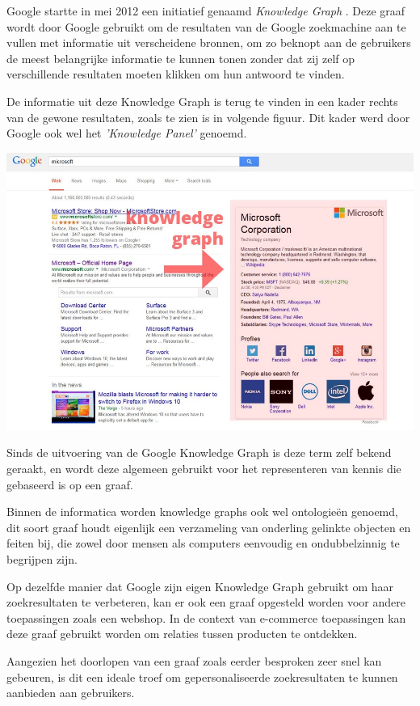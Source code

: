 Google startte in mei 2012 een initiatief genaamd \textit{Knowledge Graph} \autocite{GoogleKnowledgeGraph}. Deze graaf wordt door Google gebruikt om de resultaten van de Google zoekmachine aan te vullen met informatie uit verscheidene bronnen, om zo beknopt aan de gebruikers de meest belangrijke informatie te kunnen tonen zonder dat zij zelf op verschillende resultaten moeten klikken om hun antwoord te vinden. 

De informatie uit deze Knowledge Graph is terug te vinden in een kader rechts van de gewone resultaten, zoals te zien is in volgende figuur. Dit kader werd door Google ook wel het \textit{'Knowledge Panel'} genoemd. 

\includegraphics[width=\linewidth]{img/Google_Knowledge_Graph.jpeg}

Sinds de uitvoering van de Google Knowledge Graph is deze term zelf bekend geraakt, en wordt deze algemeen gebruikt voor het representeren van kennis die gebaseerd is op een graaf.

Binnen de informatica worden knowledge graphs ook wel ontologieën genoemd, dit soort graaf houdt eigenlijk een verzameling van onderling gelinkte objecten en feiten bij, die zowel door mensen als computers eenvoudig en ondubbelzinnig te begrijpen zijn.   

Op dezelfde manier dat Google zijn eigen Knowledge Graph gebruikt om haar zoekresultaten te verbeteren, kan er ook een graaf opgesteld worden voor andere toepassingen zoals een webshop. In de context van e-commerce toepassingen kan deze graaf gebruikt worden om relaties tussen producten te ontdekken. 

Aangezien het doorlopen van een graaf zoals eerder besproken zeer snel kan gebeuren, is dit een ideale troef om gepersonaliseerde zoekresultaten te kunnen aanbieden aan gebruikers. \autocite{E-CommerceKnowledgeGraph}

